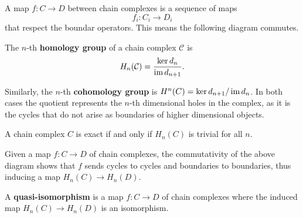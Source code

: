 \documentclass[10pt]{report}
\begin{document}
A map $f:C\to D$ between chain complexes is a sequence of maps \[f_i:C_i\to D_i\] that respect the boundar operators. This means the following diagram commutes.
\begin{center}
\end{center}

\begin{defn}[]
The $n$-th \textbf{homology group} of a chain complex $\mathcal{C}$ is
\[
	H_{n}(\mathcal{C}) = \frac{\ker d_{n}}{\operatorname{im} d_{n+1}} .
\] 
\end{defn}

Similarly, the $n$-th \textbf{cohomology group} is $H^{n}(C) = \ker d_{n+1}/\operatorname{im} d_{n}$. In both cases the quotient represents the $n$-th dimensional holes in the complex, as it is the cycles that do not arise as boundaries of higher dimensional objects.

A chain complex $C$ is exact if and only if $H_{n}(C)$ is trivial for all $n$.

Given a map $f:C \to D$ of chain complexes, the commutativity of the above diagram shows that $f$ sends cycles to cycles and boundaries to boundaries, thus inducing a map $H_{n}(C) \to H_{n}(D)$.

\begin{defn}[]
	A \textbf{quasi-isomorphism} is a map $f:C\to D$ of chain complexes where the induced map $H_{n}(C)\to H_{n}(D)$ is an isomorphism.
\end{defn}
\end{document}
